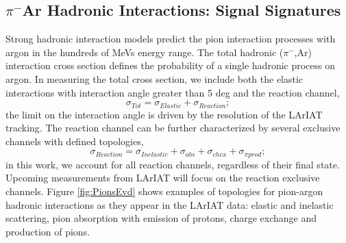 \documentclass[aps,prl,twocolumn,showpacs,superscriptaddress,groupedaddress]{revtex4}  %
\begin{document}
\subsection{\label{sec:Sign} $\pi^{-}$Ar Hadronic Interactions: Signal Signatures}
Strong hadronic interaction models \cite{9780198520085,9780471779957} predict the pion interaction processes with argon in the hundreds of MeVs energy range. 
The total hadronic ($\pi^{-}$,Ar) interaction cross section defines the probability of a single hadronic process on argon.  In measuring the total cross section, we include both the elastic interactions with interaction angle greater than 5 deg and  the reaction channel, 
\begin{equation}
\sigma_{Tot} = \sigma_{Elastic}+ \sigma_{Reaction}; 
\end{equation}
the limit on the interaction angle is driven by the resolution of the LArIAT tracking.
The reaction channel can be further characterized by several exclusive channels with defined topologies,
\begin{equation}
\sigma_{Reaction} = \sigma_{Inelastic} + \sigma_{abs} + \sigma_{chex}+ \sigma_{\pi prod};
\end{equation}
in this work, we account for all reaction channels, regardless of their final state. Upcoming measurements from LArIAT will focus on the reaction exclusive channels.
Figure \ref{fig:PionsEvd} shows examples of topologies for pion-argon hadronic interactions as they appear in the  LArIAT data: elastic and inelastic scattering, pion absorption with emission of protons, charge exchange and production of pions.
\end{document}
